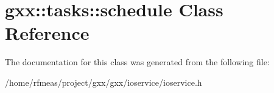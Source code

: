 \hypertarget{classgxx_1_1tasks_1_1schedule}{}\section{gxx\+:\+:tasks\+:\+:schedule Class Reference}
\label{classgxx_1_1tasks_1_1schedule}


The documentation for this class was generated from the following file\+:\begin{DoxyCompactItemize}
\item 
/home/rfmeas/project/gxx/gxx/ioservice/ioservice.\+h\end{DoxyCompactItemize}
